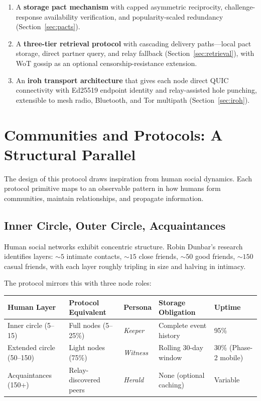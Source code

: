 \documentclass[11pt,a4paper]{article}
\begin{document}
\begin{enumerate}
  \item A \textbf{storage pact mechanism} with capped asymmetric reciprocity, challenge-response availability verification, and popularity-scaled redundancy (Section~\ref{sec:pacts}).
  \item A \textbf{three-tier retrieval protocol} with cascading delivery paths---local pact storage, direct partner query, and relay fallback (Section~\ref{sec:retrieval}), with WoT gossip as an optional censorship-resistance extension.
  \item An \textbf{iroh transport architecture} that gives each node direct QUIC connectivity with Ed25519 endpoint identity and relay-assisted hole punching, extensible to mesh radio, Bluetooth, and Tor multipath (Section~\ref{sec:iroh}).
\end{enumerate}

\section{Communities and Protocols: A Structural Parallel}

The design of this protocol draws inspiration from human social dynamics. Each protocol primitive maps to an observable pattern in how humans form communities, maintain relationships, and propagate information.

\subsection{Inner Circle, Outer Circle, Acquaintances}

Human social networks exhibit concentric structure. Robin Dunbar's research~\cite{dunbar} identifies layers: ${\sim}5$ intimate contacts, ${\sim}15$ close friends, ${\sim}50$ good friends, ${\sim}150$ casual friends, with each layer roughly tripling in size and halving in intimacy.

The protocol mirrors this with three node roles:

\begin{table}[h]
\centering
\small
\begin{tabular}{L{2.8cm}L{2.8cm}L{1.5cm}L{2.8cm}C{1.2cm}}
\toprule
\textbf{Human Layer} & \textbf{Protocol Equivalent} & \textbf{Persona} & \textbf{Storage Obligation} & \textbf{Uptime} \\
\midrule
Inner circle (5--15) & Full nodes (5--25\%) & \emph{Keeper} & Complete event history & 95\% \\
Extended circle (50--150) & Light nodes (75\%) & \emph{Witness} & Rolling 30-day window & 30\% (Phase-2 mobile) \\
Acquaintances (150+) & Relay-discovered peers & \emph{Herald} & None (optional caching) & Variable \\
\bottomrule
\end{tabular}
\end{table}
\end{document}
